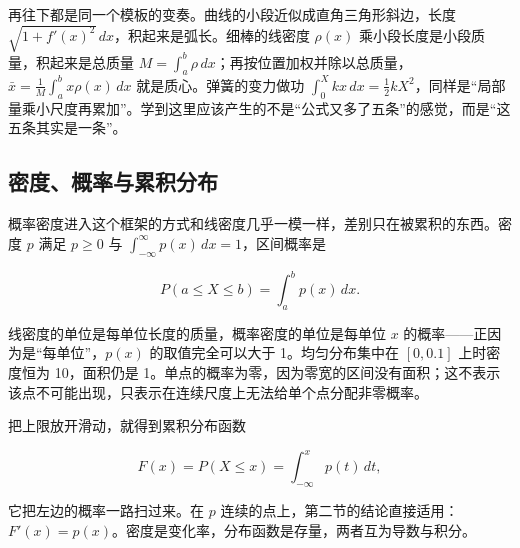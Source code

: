 再往下都是同一个模板的变奏。曲线的小段近似成直角三角形斜边，长度 \(\sqrt{1+f'(x)^2}\,dx\)，积起来是弧长。细棒的线密度 \(\rho(x)\) 乘小段长度是小段质量，积起来是总质量 \(M=\int_a^b\rho\,dx\)；再按位置加权并除以总质量，\(\bar x=\frac1M\int_a^b x\rho(x)\,dx\) 就是质心。弹簧的变力做功 \(\int_0^X kx\,dx=\frac12kX^2\)，同样是``局部量乘小尺度再累加''。学到这里应该产生的不是``公式又多了五条''的感觉，而是``这五条其实是一条''。

\subsection{密度、概率与累积分布}

概率密度进入这个框架的方式和线密度几乎一模一样，差别只在被累积的东西。密度 \(p\) 满足 \(p\ge0\) 与 \(\int_{-\infty}^{\infty}p(x)\,dx=1\)，区间概率是

\[
P(a\le X\le b)=\int_a^b p(x)\,dx .
\]

线密度的单位是每单位长度的质量，概率密度的单位是每单位 \(x\) 的概率——正因为是``每单位''，\(p(x)\) 的取值完全可以大于 1。均匀分布集中在 \([0,0.1]\) 上时密度恒为 10，面积仍是 1。单点的概率为零，因为零宽的区间没有面积；这不表示该点不可能出现，只表示在连续尺度上无法给单个点分配非零概率。

把上限放开滑动，就得到累积分布函数

\[
F(x)=P(X\le x)=\int_{-\infty}^x p(t)\,dt ,
\]

它把左边的概率一路扫过来。在 \(p\) 连续的点上，第二节的结论直接适用：\(F'(x)=p(x)\)。密度是变化率，分布函数是存量，两者互为导数与积分。

